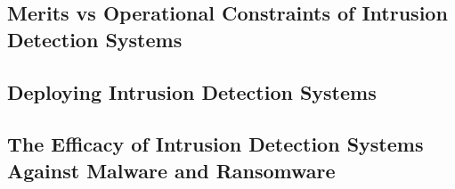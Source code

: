 
\subsection{Merits vs Operational Constraints of Intrusion Detection Systems}


\subsection{Deploying Intrusion Detection Systems}


\subsection{The Efficacy of Intrusion Detection Systems Against Malware and Ransomware}


